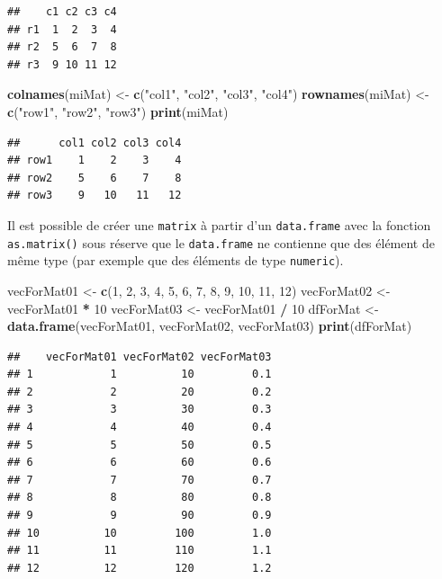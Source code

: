 \documentclass[]{book}
\newenvironment{Shaded}{\begin{snugshade}}{\end{snugshade}}
\newcommand{\DecValTok}[1]{\textcolor[rgb]{0.00,0.00,0.81}{#1}}
\newcommand{\KeywordTok}[1]{\textcolor[rgb]{0.13,0.29,0.53}{\textbf{#1}}}
\newcommand{\NormalTok}[1]{#1}
\newcommand{\OperatorTok}[1]{\textcolor[rgb]{0.81,0.36,0.00}{\textbf{#1}}}
\newcommand{\StringTok}[1]{\textcolor[rgb]{0.31,0.60,0.02}{#1}}
\begin{document}
\begin{verbatim}
##    c1 c2 c3 c4
## r1  1  2  3  4
## r2  5  6  7  8
## r3  9 10 11 12
\end{verbatim}

\begin{Shaded}
\begin{Highlighting}[]
\KeywordTok{colnames}\NormalTok{(miMat) <-}\StringTok{ }\KeywordTok{c}\NormalTok{(}\StringTok{"col1"}\NormalTok{, }\StringTok{"col2"}\NormalTok{, }\StringTok{"col3"}\NormalTok{, }\StringTok{"col4"}\NormalTok{)}
\KeywordTok{rownames}\NormalTok{(miMat) <-}\StringTok{ }\KeywordTok{c}\NormalTok{(}\StringTok{"row1"}\NormalTok{, }\StringTok{"row2"}\NormalTok{, }\StringTok{"row3"}\NormalTok{)}
\KeywordTok{print}\NormalTok{(miMat)}
\end{Highlighting}
\end{Shaded}

\begin{verbatim}
##      col1 col2 col3 col4
## row1    1    2    3    4
## row2    5    6    7    8
## row3    9   10   11   12
\end{verbatim}

Il est possible de créer une \texttt{matrix} à partir d'un \texttt{data.frame} avec la fonction \texttt{as.matrix()} sous réserve que le \texttt{data.frame} ne contienne que des élément de même type (par exemple que des éléments de type \texttt{numeric}).

\begin{Shaded}
\begin{Highlighting}[]
\NormalTok{vecForMat01 <-}\StringTok{ }\KeywordTok{c}\NormalTok{(}\DecValTok{1}\NormalTok{, }\DecValTok{2}\NormalTok{, }\DecValTok{3}\NormalTok{, }\DecValTok{4}\NormalTok{, }\DecValTok{5}\NormalTok{, }\DecValTok{6}\NormalTok{, }\DecValTok{7}\NormalTok{, }\DecValTok{8}\NormalTok{, }\DecValTok{9}\NormalTok{, }\DecValTok{10}\NormalTok{, }\DecValTok{11}\NormalTok{, }\DecValTok{12}\NormalTok{)}
\NormalTok{vecForMat02 <-}\StringTok{ }\NormalTok{vecForMat01 }\OperatorTok{*}\StringTok{ }\DecValTok{10}
\NormalTok{vecForMat03 <-}\StringTok{ }\NormalTok{vecForMat01 }\OperatorTok{/}\StringTok{ }\DecValTok{10}
\NormalTok{dfForMat <-}\StringTok{ }\KeywordTok{data.frame}\NormalTok{(vecForMat01, vecForMat02, vecForMat03)}
\KeywordTok{print}\NormalTok{(dfForMat)}
\end{Highlighting}
\end{Shaded}

\begin{verbatim}
##    vecForMat01 vecForMat02 vecForMat03
## 1            1          10         0.1
## 2            2          20         0.2
## 3            3          30         0.3
## 4            4          40         0.4
## 5            5          50         0.5
## 6            6          60         0.6
## 7            7          70         0.7
## 8            8          80         0.8
## 9            9          90         0.9
## 10          10         100         1.0
## 11          11         110         1.1
## 12          12         120         1.2
\end{verbatim}
\end{document}
